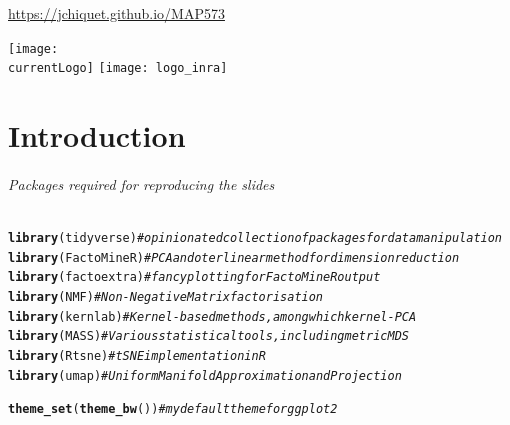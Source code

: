 \documentclass{beamer}\usepackage[]{graphicx}\usepackage[]{color}
\title{\currentCourse}
\subtitle{\huge\currentChapter\normalsize}
\institute{\currentInstitute}
\date{\currentDate}
\makeatletter
\newcommand{\hlcom}[1]{\textcolor[rgb]{0.678,0.584,0.686}{\textit{#1}}}%
\newcommand{\hlstd}[1]{\textcolor[rgb]{0.345,0.345,0.345}{#1}}%
\newcommand{\hlkwd}[1]{\textcolor[rgb]{0.737,0.353,0.396}{\textbf{#1}}}%
\newenvironment{kframe}{%
 \def\at@end@of@kframe{}%
 \ifinner\ifhmode%
  \def\at@end@of@kframe{\end{minipage}}%
  \begin{minipage}{\columnwidth}%
 \fi\fi%
 \def\FrameCommand##1{\hskip\@totalleftmargin \hskip-\fboxsep
 \colorbox{shadecolor}{##1}\hskip-\fboxsep
     \hskip-\linewidth \hskip-\@totalleftmargin \hskip\columnwidth}%
 \MakeFramed {\advance\hsize-\width
   \@totalleftmargin\z@ \linewidth\hsize
   \@setminipage}}%
 {\par\unskip\endMakeFramed%
 \at@end@of@kframe}
\newenvironment{knitrout}{}{} %
\def\currentLogo{../common_figs/logo_X}
\newcommand{\dotitlepage}{%
  \begin{frame}
    \titlepage
    \vfill
    \begin{center}
        \scriptsize\url{https://jchiquet.github.io/MAP573}
    \end{center}
    \vfill
    \texttt{[image: \\currentLogo]}\hfill
    \texttt{[image: logo\_inra]}
  \end{frame}
}
\makeatother
\begin{document}
\dotitlepage

\part{Introduction}

\begin{frame}[fragile]
  \partpage

\paragraph{Packages required for reproducing the slides}
\begin{knitrout}\scriptsize
{}\color{fgcolor}\begin{kframe}
\begin{alltt}
\hlkwd{library}\hlstd{(tidyverse)}  \hlcom{# opinionated collection of packages for data manipulation}
\hlkwd{library}\hlstd{(FactoMineR)} \hlcom{# PCA and oter linear method for dimension reduction}
\hlkwd{library}\hlstd{(factoextra)} \hlcom{# fancy plotting for FactoMineR output }
\hlkwd{library}\hlstd{(NMF)}        \hlcom{# Non-Negative Matrix factorisation}
\hlkwd{library}\hlstd{(kernlab)}    \hlcom{# Kernel-based methods, among which kernel-PCA}
\hlkwd{library}\hlstd{(MASS)}       \hlcom{# Various statistical tools, including metric MDS}
\hlkwd{library}\hlstd{(Rtsne)}      \hlcom{# tSNE implementation in R }
\hlkwd{library}\hlstd{(umap)}       \hlcom{# Uniform Manifold Approximation and Projection}

\hlkwd{theme_set}\hlstd{(}\hlkwd{theme_bw}\hlstd{())} \hlcom{# my default theme for ggplot2}
\end{alltt}
\end{kframe}
\end{knitrout}

\end{frame}
\end{document}
